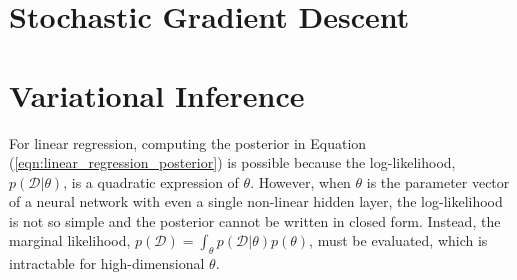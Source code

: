 \documentclass[msc,deptreport.inf]{infthesis} %
\begin{document}
\section{Stochastic Gradient Descent}

\section{Variational Inference}\label{sec:vi}

For linear regression, computing the posterior in Equation (\ref{eqn:linear_regression_posterior}) is possible because the log-likelihood, $p(\mathcal{D} | \theta)$, is a quadratic expression of $\theta$. However, when $\theta$ is the parameter vector of a neural network with even a single non-linear hidden layer, the log-likelihood is not so simple and the posterior cannot be written in closed form. Instead, the marginal likelihood, $p(\mathcal{D}) = \int_\theta p(\mathcal{D} | \theta) p(\theta)$, must be evaluated, which is intractable for high-dimensional $\theta$. 
\end{document}
